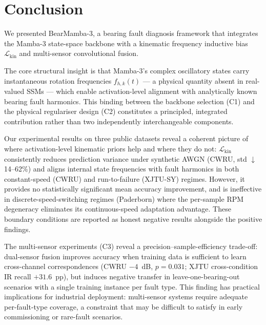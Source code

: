 
\section{Conclusion}
\label{sec:conclusion}

We presented BearMamba-3, a bearing fault diagnosis framework that integrates
the Mamba-3 state-space backbone with a kinematic frequency inductive bias
$\mathcal{L}_{\text{kin}}$ and multi-sensor convolutional fusion.

The core structural insight is that Mamba-3's complex oscillatory states carry
instantaneous rotation frequencies $f_{h,k}(t)$ — a physical quantity absent
in real-valued SSMs — which enable activation-level alignment with analytically
known bearing fault harmonics.
This binding between the backbone selection (C1) and the physical regulariser
design (C2) constitutes a principled, integrated contribution rather than two
independently interchangeable components.

Our experimental results on three public datasets reveal a coherent picture
of where activation-level kinematic priors help and where they do not:
$\mathcal{L}_{\text{kin}}$ consistently reduces prediction variance under
synthetic AWGN (CWRU, std $\downarrow$14--62\%) and aligns internal state
frequencies with fault harmonics in both constant-speed (CWRU) and
run-to-failure (XJTU-SY) regimes.
However, it provides no statistically significant mean accuracy improvement,
and is ineffective in discrete-speed-switching regimes (Paderborn) where the
per-sample RPM degeneracy eliminates its continuous-speed adaptation advantage.
These boundary conditions are reported as honest negative results alongside
the positive findings.

The multi-sensor experiments (C3) reveal a precision--sample-efficiency
trade-off: dual-sensor fusion improves accuracy when training data is
sufficient to learn cross-channel correspondences (CWRU $-4$~dB, $p=0.031$;
XJTU cross-condition IR recall $+31.6$~pp), but induces negative transfer in
leave-one-bearing-out scenarios with a single training instance per fault type.
This finding has practical implications for industrial deployment: multi-sensor
systems require adequate per-fault-type coverage, a constraint that may be
difficult to satisfy in early commissioning or rare-fault scenarios.

